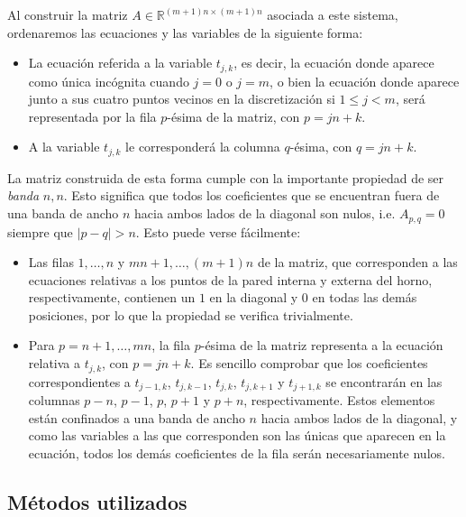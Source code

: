 \documentclass[11pt, a4paper, spanish]{article}
\theoremstyle{plain}
\theoremstyle{remark}
\begin{document}
    Al construir la matriz $A \in \mathbb{R}^{(m+1)n \times (m+1)n}$ asociada a este sistema, ordenaremos las ecuaciones y las variables de la siguiente forma:
    \begin{itemize}
      \item La ecuación referida a la variable $t_{j,k}$, es decir, la ecuación donde aparece como única incógnita cuando $j = 0$ o $j = m$, o bien la ecuación donde aparece junto a sus cuatro puntos vecinos en la discretización si $1 \leq j < m$, será representada por la fila $p$-ésima de la matriz, con $p = jn+k$.
      \item A la variable $t_{j,k}$ le corresponderá la columna $q$-ésima, con $q = jn+k$.
    \end{itemize}

    La matriz construida de esta forma cumple con la importante propiedad de ser \emph{banda} $n, n$. Esto significa que todos los coeficientes que se encuentran fuera de una banda de ancho $n$ hacia ambos lados de la diagonal son nulos, i.e. $A_{p,q} = 0$ siempre que $\vert p - q \vert > n$. Esto puede verse fácilmente:

    \begin{itemize}
      \item Las filas $1, \dots, n$ y $mn + 1, \dots, (m+1)n$ de la matriz, que corresponden a las ecuaciones relativas a los puntos de la pared interna y externa del horno, respectivamente, contienen un $1$ en la diagonal y $0$ en todas las demás posiciones, por lo que la propiedad se verifica trivialmente.
      \item Para $p = n + 1, \dots, mn$, la fila $p$-ésima de la matriz representa a la ecuación relativa a $t_{j,k}$, con $p = jn+k$. Es sencillo comprobar que los coeficientes correspondientes a $t_{j-1,k}$, $t_{j,k-1}$, $t_{j,k}$, $t_{j,k+1}$ y $t_{j+1,k}$ se encontrarán en las columnas $p-n$, $p-1$, $p$, $p+1$ y $p+n$, respectivamente. Estos elementos están confinados a una banda de ancho $n$ hacia ambos lados de la diagonal, y como las variables a las que corresponden son las únicas que aparecen en la ecuación, todos los demás coeficientes de la fila serán necesariamente nulos.
    \end{itemize}

  \subsection{Métodos utilizados}

\end{document}

